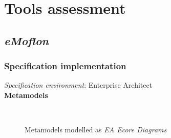 \documentclass{article}
\begin{document}
\pagebreak
\section{Tools assessment}

\subsection{\textit{eMoflon}}

\subsubsection{Specification implementation}

\textit{Specification environment}: Enterprise Architect~\cite{EA}
~\\

\textbf{Metamodels}

\begin{figure}[ht]
    \centering
    \mbox{\quad
          }
    \caption{Metamodels modelled as \textit{EA Ecore Diagrams}}
    \label{fig:eMoIMP1}
\end{figure}
\end{document}
